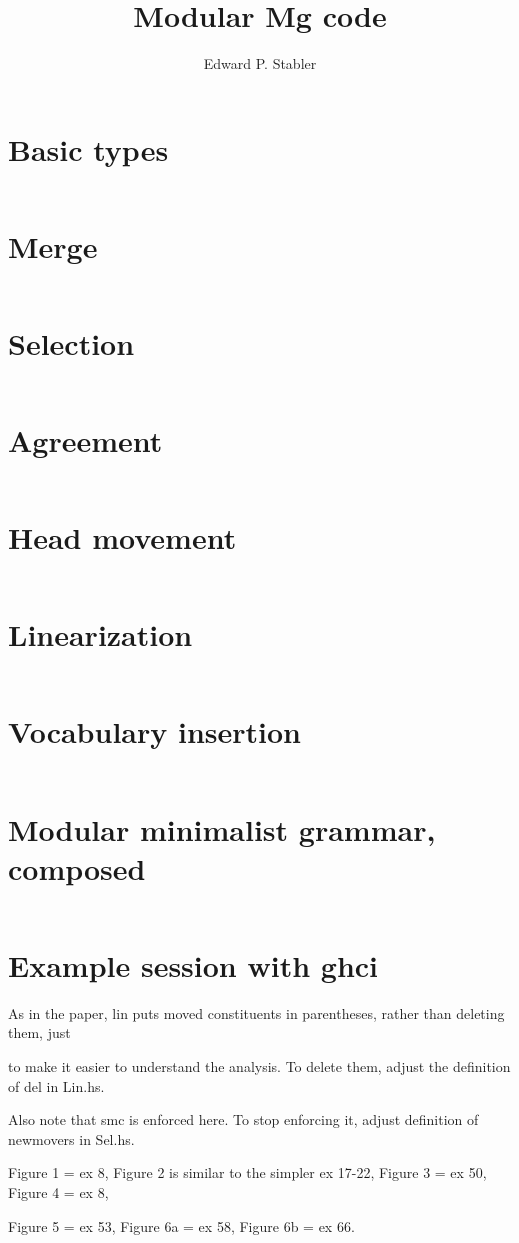 \documentclass{article}
\title{Modular Mg code}
\author{Edward P. Stabler}
\begin{document}
\thispagestyle{empty}

\setcounter{section}{-1}

\eject
\section{Basic types}
\inputminted[fontsize=\footnotesize]{haskell}{MgTypes.hs}

\section{Merge}
\inputminted[fontsize=\footnotesize]{haskell}{Mrg.hs}

\section{Selection}
\inputminted[fontsize=\footnotesize]{haskell}{Sel.hs}

\eject
\section{Agreement}
\inputminted[fontsize=\footnotesize]{haskell}{Agr.hs}

\vfill\eject
\section{Head movement}
\inputminted[fontsize=\footnotesize]{haskell}{Hm.hs}

\section{Linearization}
\inputminted[fontsize=\footnotesize]{haskell}{Lin.hs}

\eject
\section{Vocabulary insertion}
\inputminted[fontsize=\footnotesize]{haskell}{Vi.hs}

\section{Modular minimalist grammar, composed}
\inputminted[fontsize=\footnotesize]{haskell}{Mg.hs}

\eject
\section*{Example session with ghci}
As in the paper, lin puts moved constituents in parentheses, rather
than deleting them, just

to make it easier to understand the analysis. To delete them, adjust
the definition of del in Lin.hs.

\noindent
Also note that smc is enforced here. To stop enforcing it, adjust
definition of newmovers in Sel.hs.

\noindent
Figure 1 = ex 8,
Figure 2 is similar to the simpler ex 17-22,
Figure 3 = ex 50,
Figure 4 = ex 8,

Figure 5 = ex 53,
Figure 6a = ex 58,
Figure 6b = ex 66.

\inputminted[fontsize=\footnotesize]{haskell}{Examples-session.txt}
\end{document}
